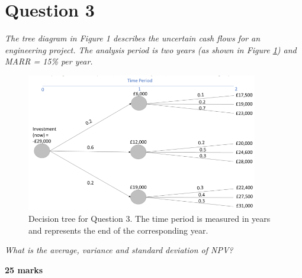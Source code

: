\section{Question 3}
\textit{The tree diagram in Figure 1 describes the uncertain cash flows for an engineering project. The analysis period is two years (as shown in Figure \ref{fig:dt1}) and MARR = 15\% per year.}
\begin{figure}[H]
    \centering
    \includegraphics[width = 0.9\textwidth]{img/figure65.png}
    \caption{Decision tree for Question 3. The time period is measured in years and represents the end of the corresponding year.}
    \label{fig:dt1}
\end{figure}
\textit{What is the average, variance and standard deviation of NPV?}

\textbf{25 marks}

